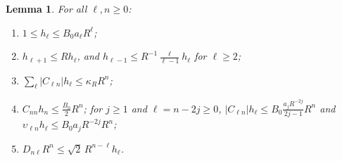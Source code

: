 \documentclass[11pt]{amsart}
\newtheorem{lemma}[theorem]{Lemma}
\theoremstyle{definition}
\theoremstyle{remark}
\numberwithin{equation}{section}
\begin{document}
\begin{lemma}\label{r3:lem-weights}
For all $\ell,n\geq0$:
\begin{enumerate}[label=\textup{(\alph*)}]
\item $1\leq h_\ell\leq B_0a_\ell R^\ell$;
\item $h_{\ell+1}\leq Rh_\ell$, and $h_{\ell-1}\leq R^{-1}\frac{\ell}{\ell-1}h_\ell$ for $\ell\geq2$;
\item $\sum_\ell|C_{\ell n}|h_\ell\leq\kappa_RR^n$;
\item $C_{nn}h_n\leq\frac{B_0}2R^n$; for $j\geq1$ and $\ell=n-2j\geq0$, $|C_{\ell n}|h_\ell\leq B_0\frac{a_jR^{-2j}}{2j-1}R^n$ and $\upsilon_{\ell n}h_\ell\leq B_0a_jR^{-2j}R^n$;
\item $D_{n\ell}R^n\leq\sqrt2\,R^{n-\ell}h_\ell$.
\end{enumerate}
\end{lemma}
\end{document}
